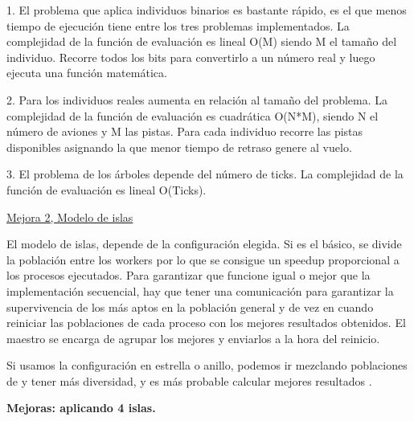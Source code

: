 1. El problema que aplica individuos binarios es bastante rápido, es el que menos tiempo de ejecución tiene entre los tres problemas implementados. 
La complejidad de la función de evaluación es lineal O(M) siendo M el tamaño del individuo. Recorre todos los bits para convertirlo a un número real y luego ejecuta una función matemática.

2. Para los individuos reales aumenta en relación al tamaño del problema. 
La complejidad de la función de evaluación es cuadrática O(N*M), siendo N el número de aviones y M las pistas. Para cada individuo recorre las pistas disponibles asignando la que menor tiempo de retraso genere al vuelo. 

3. El problema de los árboles depende del número de ticks.
La complejidad de la función de evaluación es lineal O(Ticks).

\underline{Mejora 2, Modelo de islas}

El modelo de islas, depende de la configuración elegida. Si es el básico, se divide la población entre los workers por lo que se consigue un speedup proporcional a los procesos ejecutados. Para garantizar que funcione igual o mejor que la implementación secuencial, hay que tener una comunicación para garantizar la supervivencia de los más aptos en la población general y de vez en cuando reiniciar las poblaciones de cada proceso con los mejores resultados obtenidos. El maestro se encarga de agrupar los mejores y enviarlos a la hora del reinicio. 

Si usamos la configuración en estrella o anillo, podemos ir mezclando poblaciones de y tener más diversidad, y es más probable calcular mejores resultados .

\begin{flushleft}
	\textbf{Mejoras: aplicando 4 islas.}
\end{flushleft}


